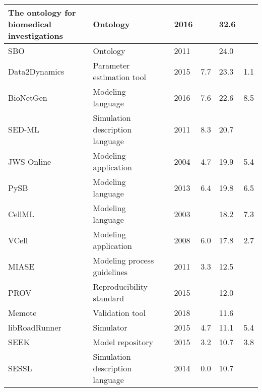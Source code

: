 \begin{longtable}{L{2.2cm}L{4cm}L{1cm}L{0.8cm}R{1.1cm}R{1cm}R{1cm}}
\midrule
\small{The ontology for biomedical investigations} &\small{Ontology} &\cite{Bandrowski2016TheInvestigations} &\small{2016} &\small{} &\small{32.6} &\small{}\\
\midrule
\small{SBO} &\small{Ontology} &\cite{Courtot2011ControlledBiology.} &\small{2011} &\small{} &\small{24.0} &\small{}\\
\midrule
\small{Data2Dynamics} &\small{Parameter estimation tool} &\cite{Raue2015Data2Dynamics:Systems} &\small{2015} &\small{7.7} &\small{23.3} &\small{1.1}\\
\midrule
\small{BioNetGen} &\small{Modeling language} &\cite{Harris2016BioNetGenModeling} &\small{2016} &\small{7.6} &\small{22.6} &\small{8.5}\\
\midrule
\small{SED-ML} &\small{Simulation description language} &\cite{Waltemath2011ReproducibleLanguage} &\small{2011} &\small{8.3} &\small{20.7} &\small{}\\
\midrule
\small{JWS Online} &\small{Modeling application} &\cite{Olivier2004Web-basedOnline} &\small{2004} &\small{4.7} &\small{19.9} &\small{5.4}\\
\midrule
\small{PySB} &\small{Modeling language} &\cite{Lopez2013ProgrammingPySB} &\small{2013} &\small{6.4} &\small{19.8} &\small{6.5}\\
\midrule
\small{CellML} &\small{Modeling language} &\cite{Cuellar2003AnLanguage} &\small{2003} &\small{} &\small{18.2} &\small{7.3}\\
\midrule
\small{VCell} &\small{Modeling application} &\cite{moraru2008virtual} &\small{2008} &\small{6.0} &\small{17.8} &\small{2.7}\\
\midrule
\small{MIASE} &\small{Modeling process guidelines} &\cite{Waltemath2011MinimumMIASE} &\small{2011} &\small{3.3} &\small{12.5} &\small{}\\
\midrule
\small{PROV} &\small{Reproducibility standard} &\cite{Moreau2015ThePROV} &\small{2015} &\small{} &\small{12.0} &\small{}\\
\midrule
\small{Memote} &\small{Validation tool} &\cite{Lieven2018Memote:Suite} &\small{2018} &\small{} &\small{11.6} &\small{}\\
\midrule
\small{libRoadRunner} &\small{Simulator} &\cite{Somogyi2015LibRoadRunner:Library.} &\small{2015} &\small{4.7} &\small{11.1} &\small{5.4}\\
\midrule
\small{SEEK} &\small{Model repository} &\cite{Wolstencroft2015SEEK:Platform} &\small{2015} &\small{3.2} &\small{10.7} &\small{3.8}\\
\midrule
\small{SESSL} &\small{Simulation description language} &\cite{Ewald2014SESSL:Experiments} &\small{2014} &\small{0.0} &\small{10.7} &\small{}\\

\end{longtable}
